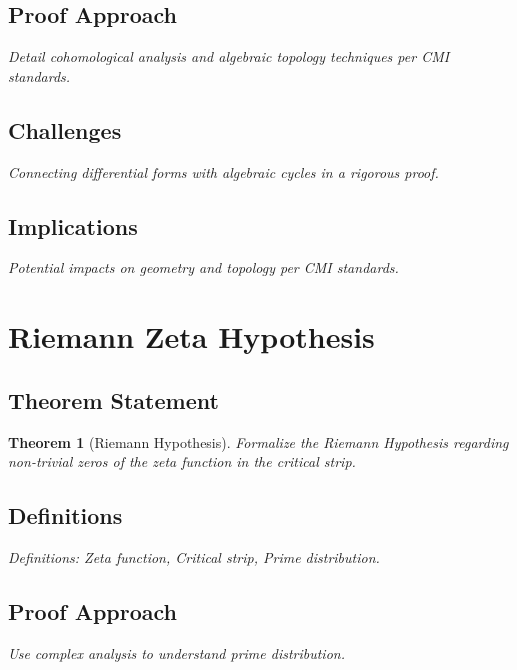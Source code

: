 \documentclass[12pt, a4paper]{article}
\newtheorem{theorem}{Theorem}[section]
\begin{document}
\subsection{Proof Approach}
\textit{Detail cohomological analysis and algebraic topology techniques per CMI standards.}

\subsection{Challenges}
\textit{Connecting differential forms with algebraic cycles in a rigorous proof.}

\subsection{Implications}
\textit{Potential impacts on geometry and topology per CMI standards.}


\section{Riemann Zeta Hypothesis}
\subsection{Theorem Statement}
\begin{theorem}[Riemann Hypothesis]
\label{thm:riemann}
\textit{Formalize the Riemann Hypothesis regarding non-trivial zeros of the zeta function in the critical strip.}
\end{theorem}

\subsection{Definitions}
\textit{Definitions: Zeta function, Critical strip, Prime distribution.}

\subsection{Proof Approach}
\textit{Use complex analysis to understand prime distribution.}
\end{document}
